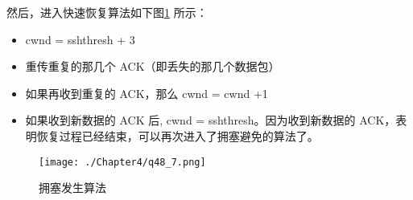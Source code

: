 \documentclass[cn,11pt,color=blue,lang=cn]{elegantbook}
\begin{document}
\begin{solution}
然后，进入快速恢复算法如下图\ref{fig48_7} 所示：
\begin{itemize}
	\item cwnd = sshthresh + 3
	\item 重传重复的那几个 ACK（即丢失的那几个数据包）
	\item 如果再收到重复的 ACK，那么 cwnd = cwnd +1
	\item 如果收到新数据的 ACK 后, cwnd = sshthresh。因为收到新数据的 ACK，表明恢复过程已经结束，可以再次进入了拥塞避免的算法了。
\end{itemize}

\begin{figure}[htbp]
\centering
\texttt{[image: ./Chapter4/q48\_7.png]}
\caption{拥塞发生算法}
\label{fig48_7}
\end{figure}

\end{solution}
\end{document}
